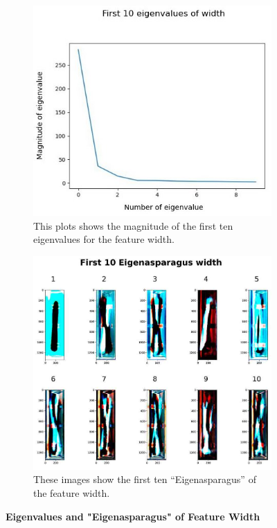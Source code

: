 \begin{figure}[H]
	\centering
	\begin{subfigure}{0.7\textwidth}
		\includegraphics[width=0.9\linewidth]{Figures/chapter04/pca_width_graph.png} 
		\caption{This plots shows the magnitude of the first ten eigenvalues for the feature width.}
	\end{subfigure}
	\vspace{20pt}
	
	\begin{subfigure}{0.9\textwidth}
		\includegraphics[width=0.9\linewidth]{Figures/chapter04/pca_width.png}
		\caption{These images show the first ten “Eigenasparagus” of the feature width.}
	\end{subfigure}
    \caption[First ten Eigenvalues and "Eigenasparagus" of Feature Width]{\textbf{Eigenvalues and "Eigenasparagus" of Feature Width}}
    \label{fig:PCAwidth}
\end{figure}

